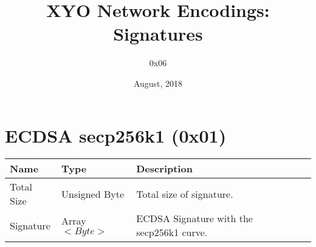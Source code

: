 \documentclass[11pt]{article}
\title{XYO Network Encodings: Signatures}
\author{0x06}
\date{August, 2018}
\begin{document}
\maketitle

\section{ECDSA secp256k1 (0x01)}

\begin{center}
\begin{tabular}{ |l|l|l|l| } 
\hline
\textbf{Name} & \textbf{Type} & \textbf{Description}\\
\hline
Total Size & Unsigned Byte & Total size of signature. \\
Signature & Array$<Byte>$ & ECDSA Signature with the secp256k1 curve.\\ 
   
\hline
\end{tabular}
\end{center}
\end{document}
